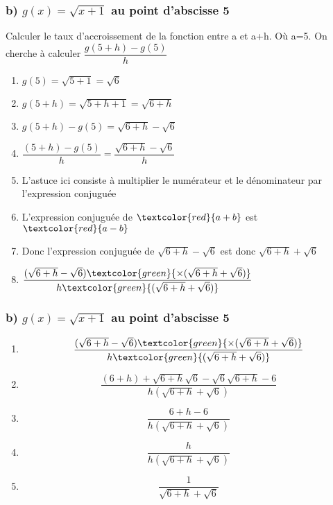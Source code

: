 \documentclass[t]{beamer}
\begin{document}
\begin{frame}
\frametitle{b) $g(x) = \sqrt{x+1}$ au point d'abscisse 5}
\pause
Calculer le taux d'accroissement de la fonction entre a et a+h. \pause Où a=5.
\pause
On cherche à calculer \( \dfrac{g(5+h) - g(5)}{h} \)
\pause
\begin{enumerate}[]
\item<+-> \(g(5) = \sqrt{5+1} = \sqrt{6} \)
\item<+-> \(g(5+h) = \sqrt{5+h+1} = \sqrt{6+h} \)
\item<+-> \(g(5+h) - g(5) = \sqrt{6+h} - \sqrt{6} \)
\item<+-> \( \dfrac{(5+h) - g(5)}{h} = \dfrac{\sqrt{6+h} - \sqrt{6}}{h} \)
\item<+-> L'astuce ici consiste à multiplier le numérateur et le dénominateur par \color{red}l'expression conjuguée
\item<+-> L'expression conjuguée de $\textcolor{red}{a+b}$ est $\textcolor{red}{a-b}$
\item<+-> Donc l'expression conjuguée de $\sqrt{6+h} - \sqrt{6}$ est donc $\sqrt{6+h} + \sqrt{6}$
\item<+-> \(\dfrac{(\sqrt{6+h} - \sqrt{6}) \textcolor{green}{\times (\sqrt{6+h} + \sqrt{6})}}{h \textcolor{green}{(\sqrt{6+h} + \sqrt{6})}}\)
\end{enumerate}
\end{frame}

\begin{frame}[label=pagebanale]
\frametitle{b) $g(x) = \sqrt{x+1}$ au point d'abscisse 5}
\pause
\begin{enumerate}[]
\item<+-> \[\dfrac{(\sqrt{6+h} - \sqrt{6}) \textcolor{green}{\times (\sqrt{6+h} + \sqrt{6})}}{h \textcolor{green}{(\sqrt{6+h} + \sqrt{6})}}\]
\item<+-> \[\dfrac{(6+h) + \sqrt{6+h}\sqrt{6} - \sqrt{6}\sqrt{6+h} - 6}{h (\sqrt{6+h} + \sqrt{6})} \]
\item<+-> \[\dfrac{6+h - 6}{h (\sqrt{6+h} + \sqrt{6})} \]
\item<+-> \[\dfrac{h}{h (\sqrt{6+h} + \sqrt{6})} \]
\item<+-> \[\dfrac{1}{\sqrt{6+h} + \sqrt{6}} \]
\end{enumerate}
\end{frame}
\end{document}
